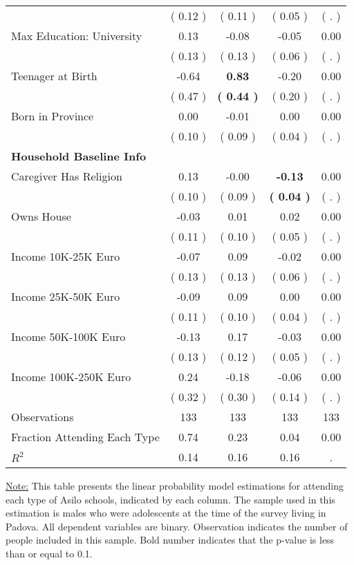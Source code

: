 \begin{table}[H]
{\begin{tabular}{lcccc}
\quad  & (     0.12 ) & (     0.11 )  & (     0.05 )  & (        . )  \\
\quad Max Education: University &      0.13 &     -0.08 &     -0.05 &      0.00 \\
\quad  & (     0.13 ) & (     0.13 )  & (     0.06 )  & (        . )  \\
\quad Teenager at Birth &     -0.64 & \textbf{     0.83} &     -0.20 &      0.00 \\
\quad  & (     0.47 ) & \textbf{(     0.44 )}  & (     0.20 )  & (        . )  \\
\quad Born in Province &      0.00 &     -0.01 &      0.00 &      0.00 \\
\quad  & (     0.10 ) & (     0.09 )  & (     0.04 )  & (        . )  \\
\midrule
\textbf{Household Baseline Info} \\
\quad Caregiver Has Religion &      0.13 &     -0.00 & \textbf{    -0.13} &      0.00 \\
\quad  & (     0.10 ) & (     0.09 )  & \textbf{(     0.04 )}  & (        . )  \\
\quad Owns House &     -0.03 &      0.01 &      0.02 &      0.00 \\
\quad  & (     0.11 ) & (     0.10 )  & (     0.05 )  & (        . )  \\
\quad Income 10K-25K Euro &     -0.07 &      0.09 &     -0.02 &      0.00 \\
\quad  & (     0.13 ) & (     0.13 )  & (     0.06 )  & (        . )  \\
\quad Income 25K-50K Euro &     -0.09 &      0.09 &      0.00 &      0.00 \\
\quad  & (     0.11 ) & (     0.10 )  & (     0.04 )  & (        . )  \\
\quad Income 50K-100K Euro &     -0.13 &      0.17 &     -0.03 &      0.00 \\
\quad  & (     0.13 ) & (     0.12 )  & (     0.05 )  & (        . )  \\
\quad Income 100K-250K Euro &      0.24 &     -0.18 &     -0.06 &      0.00 \\
\quad  & (     0.32 ) & (     0.30 )  & (     0.14 )  & (        . )  \\
\midrule
Observations & 133 & 133 & 133 & 133 \\
Fraction Attending Each Type &      0.74 &      0.23 &      0.04 &      0.00 \\
\midrule
$ R^2$ &      0.14 &      0.16 &      0.16 &         . \\
\bottomrule
\end{tabular}}
\end{table}
\begin{footnotesize}
\noindent\underline{Note:} This table presents the linear probability model estimations for attending each type of Asilo schools, indicated by each column. The sample used in this estimation is males who were adolescents at the time of the survey living in Padova. All dependent variables are binary. Observation indicates the number of people included in this sample. Bold number indicates that the p-value is less than or equal to 0.1.
\end{footnotesize}
